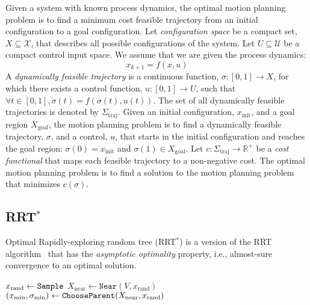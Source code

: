 \documentclass[letterpaper, 10pt, english, conference]{IEEEtran}
\begin{document}
Given a system with known process dynamics, the
optimal motion planning problem is to find a minimum cost feasible
trajectory from an initial configuration to a goal configuration. Let
{\em configuration space} be a compact set, $X \subseteq \mathcal{X}$,
that describes all possible configurations of the system. Let $U
\subseteq \mathcal{U}$ be a compact control input space. We assume that we
are given the process dynamics:
\[
x_{k+1} = f(x,u)
\]
A {\em dynamically feasible trajectory} is a continuous function,
$\sigma: [0,1] \to X$, for which there exists a control function,
$u:[0,1] \to U$, such that $\forall t \in [0,1], \dot{\sigma}(t) =
f(\sigma(t),u(t))$. The set of all dynamically feasible trajectories
is denoted by $\Sigma_\mathrm{traj}$. Given an initial configuration,
$x_\mathrm{init}$, and a goal region $X_\mathrm{goal}$, the motion
planning problem is to find a dynamically feasible trajectory,
$\sigma$, and a control, $u$, that starts in the initial configuration
and reaches the goal region: $\sigma(0) = x_\mathrm{init}$ and
$\sigma(1) \in X_\mathrm{goal}$. Let $c : \Sigma_\mathrm{traj} \to
\mathbb{R}^+$ be a {\em cost functional} that maps each feasible
trajectory to a non-negative cost. The optimal motion planning problem
is to find a solution to the motion planning problem that minimizes
$c(\sigma)$.

\subsection{RRT$^*$}

Optimal Rapidly-exploring random tree (RRT$^*$) \cite{karaman.frazzoli.ijrr11} is a version of the RRT algorithm~\cite{lavalle.kuffner.ijrr01} that has the \emph{asymptotic optimality} property, i.e., almost-sure convergence to an optimal solution.

\begin{center}
\begin{algorithm}
 { \label{line:iteration_start_orig}
	$x_\mathrm{rand} \leftarrow {\tt Sample}$\; \label{line:rrtstar:sample}
	$X_\mathrm{near} \leftarrow \mathtt{Near}(V ,x_\mathrm{rand})$\; \label{line:rrtstar:compute_near_orig}
	$(x_\mathrm{min},\sigma_\mathrm{min}) \leftarrow {\tt ChooseParent}(X_\mathrm{near}, x_\mathrm{rand})$\; \label{line:rrtstar:call_find_min_cost_parent}
	}
\;
\caption{${\tt RRT}^* ((V,E), N)$}
\label{algorithm:rrtstar_orig}
\end{algorithm}
\end{center}
\end{document}
